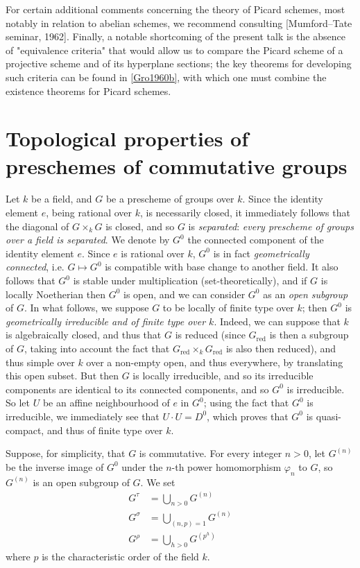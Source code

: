   For certain additional comments concerning the theory of Picard schemes, most notably in relation to abelian schemes, we recommend consulting [Mumford–Tate seminar, 1962].
  Finally, a notable shortcoming of the present talk is the absence of "equivalence criteria" that would allow us to compare the Picard scheme of a projective scheme and of its hyperplane sections;
  the key theorems for developing such criteria can be found in \hyperref[Gro1960b]{[Gro1960b]}, with which one must combine the existence theorems for Picard schemes.\chapter{Topological properties of preschemes of commutative groups}\thispagestyle{fancy}\label{fga3.vi-1}\par{}Let \(k\) be a field, and \(G\) be a prescheme of groups over \(k\).
  Since the identity element \(e\), being rational over \(k\), is necessarily closed, it immediately follows that the diagonal of \(G\times _k G\) is closed, and so \(G\) is \emph{separated}: \emph{every prescheme of groups over a field is separated}.
  We denote by \(G^0\) the connected component of the identity element \(e\).
  Since \(e\) is rational over \(k\), \(G^0\) is in fact \emph{geometrically connected}, i.e. \(G\mapsto  G^0\) is compatible with base change to another field.
  It also follows that \(G^0\) is stable under multiplication (set-theoretically), and if \(G\) is locally Noetherian then \(G^0\) is open, and we can consider \(G^0\) as an \emph{open subgroup} of \(G\).
  In what follows, we suppose \(G\) to be locally of finite type over \(k\);
  then \(G^0\) is \emph{geometrically irreducible and of finite type over \(k\)}.
  Indeed, we can suppose that \(k\) is algebraically closed, and thus that \(G\) is reduced (since \(G_\mathrm {red}\) is then a subgroup of \(G\), taking into account the fact that \(G_\mathrm {red}\times _k G_\mathrm {red}\) is also then reduced), and thus simple over \(k\) over a non-empty open, and thus everywhere, by translating this open subset.
  But then \(G\) is locally irreducible, and so its irreducible components are identical to its connected components, and so \(G^0\) is irreducible.
  So let \(U\) be an affine neighbourhood of \(e\) in \(G^0\);
  using the fact that \(G^0\) is irreducible, we immediately see that \(U\cdot  U=D^0\), which proves that \(G^0\) is quasi-compact, and thus of finite type over \(k\).\par{}Suppose, for simplicity, that \(G\) is commutative.
  For every integer \(n>0\), let \(G^{(n)}\) be the inverse image of \(G^0\) under the \(n\)-th power homomorphism \(\varphi _n\) to \(G\), so \(G^{(n)}\) is an open subgroup of \(G\).
  We set
  \[     \begin {aligned}       G^\tau        &= \bigcup _{n>0} G^{(n)}     \\G^\sigma        &= \bigcup _{(n,p)=1} G^{(n)}     \\G^\rho        &= \bigcup _{h>0} G^{(p^h)}     \end {aligned}   \]
  where \(p\) is the characteristic order of the field \(k\).
  
